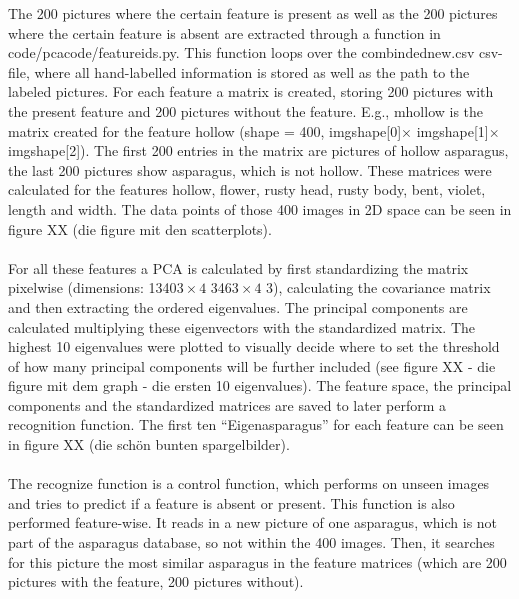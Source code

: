 The 200 pictures where the certain feature is present as well as the 200 pictures where the certain feature is absent are extracted through a function in code/pca\textunderscore code/feature\textunderscore ids.py. This function loops over the combinded\textunderscore new.csv csv-file, where all hand-labelled information is stored as well as the path to the labeled pictures. For each feature a matrix is created, storing 200 pictures with the present feature and 200 pictures without the feature. E.g., m\textunderscore hollow is the matrix created for the feature hollow (shape = 400, img\textunderscore shape[0]$\times$ img\textunderscore shape[1]$\times$ img\textunderscore shape[2]). The first 200 entries in the matrix are pictures of hollow asparagus, the last 200 pictures show asparagus, which is not hollow. These matrices were calculated for the features hollow,  flower, rusty head, rusty body, bent, violet, length and width. The data points of those 400 images in 2D space can be seen in figure XX (die figure mit den scatterplots).  \\
\\
For all these features a PCA is calculated by first standardizing the matrix pixelwise (dimensions: 1340$3\times4$ 346$3\times4$ 3), calculating the covariance matrix and then extracting the ordered eigenvalues. The principal components are calculated multiplying these eigenvectors with the standardized matrix. The highest 10 eigenvalues were plotted to visually decide where to set the threshold of how many principal components will be further included (see figure XX - die figure mit dem graph - die ersten 10 eigenvalues). The feature space, the principal components and the standardized matrices are saved to later perform a recognition function. The first ten “Eigenasparagus” for each feature can be seen in figure XX (die schön bunten spargelbilder).  \\
\\
The recognize function is a control function, which performs on unseen images and tries to predict if a feature is absent or present. This function is also performed feature-wise. It reads in a new picture of one asparagus, which is not part of the asparagus database, so not within the 400 images. Then, it searches for this picture the most similar asparagus in the feature matrices (which are 200 pictures with the feature, 200 pictures without).  \\
